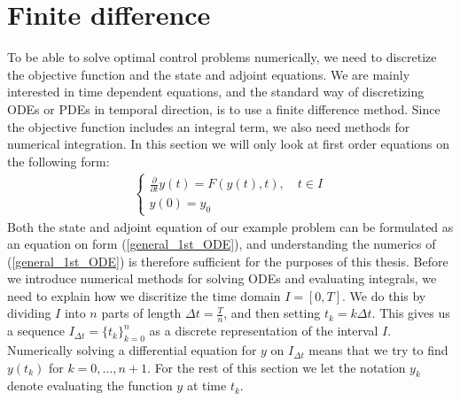 \section{Finite difference}
To be able to solve optimal control problems numerically, we need to discretize the objective function and the state and adjoint equations. We are mainly interested in time dependent equations, and the standard way of discretizing ODEs or PDEs in temporal direction, is to use a finite difference method. Since the objective function includes an integral term, we also need methods for numerical integration. In this section we will only look at first order equations on the following form:
\begin{align}
\left\{
     \begin{array}{lr}
	\frac{\partial}{\partial t} y(t) = F(y(t),t),\quad t\in I \\
	y(0)=y_0 
	\end{array}
\right.\label{general_1st_ODE}
\end{align}
Both the state and adjoint equation of our example problem can be formulated as an equation on form (\ref{general_1st_ODE}), and understanding the numerics of (\ref{general_1st_ODE}) is therefore sufficient for the purposes of this thesis. Before we introduce numerical methods for solving ODEs and evaluating integrals, we need to explain how we discritize the time domain $I=[0,T]$. We do this by dividing $I$ into $n$ parts of length $\Delta t=\frac{T}{n}$, and then setting $t_k=k\Delta t$. This gives us a sequence $I_{\Delta t}=\{t_k\}_{k=0}^{n}$ as a discrete representation of the interval $I$. Numerically solving a differential equation for $y$ on $I_{\Delta t}$ means that we try to find $y(t_k)$ for $k=0,...,n+1$. For the rest of this section we let the notation $y_k$ denote evaluating the function $y$ at time $t_k$.
